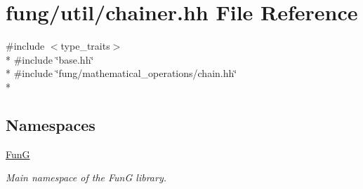 \hypertarget{chainer_8hh}{}\section{fung/util/chainer.hh File Reference}
\label{chainer_8hh}
{\ttfamily \#include $<$type\+\_\+traits$>$}\\*
{\ttfamily \#include \char`\"{}base.\+hh\char`\"{}}\\*
{\ttfamily \#include \char`\"{}fung/mathematical\+\_\+operations/chain.\+hh\char`\"{}}\\*
\subsection*{Namespaces}
\begin{DoxyCompactItemize}
\item 
 \hyperlink{namespaceFunG}{Fun\+G}
\begin{DoxyCompactList}\small\item\em Main namespace of the Fun\+G library. \end{DoxyCompactList}\end{DoxyCompactItemize}
